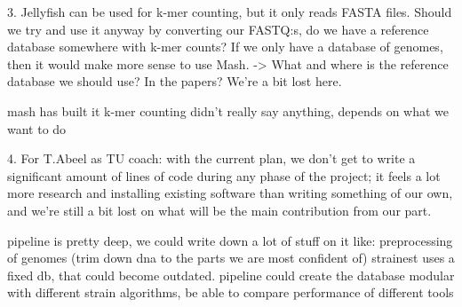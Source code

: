 3. Jellyfish can be used for k-mer counting, but it only reads FASTA files. Should we try and use it anyway by converting our FASTQ:s, do we have a reference database somewhere with k-mer counts? If we only have a database of genomes, then it would make more sense to use Mash. -> What and where is the reference database we should use? In the papers? We're a bit lost here.

mash has built it k-mer counting
didn't really say anything, depends on what we want to do


4. For T.Abeel as TU coach: with the current plan, we don't get to write a significant amount of lines of code during any phase of the project; it feels a lot more research and installing existing software than writing something of our own, and we're still a bit lost on what will be the main contribution from our part.


pipeline is pretty deep, we could write down a lot of stuff on it
like: preprocessing of genomes (trim down dna to the parts we are most confident of)
strainest uses a fixed db, that could become outdated. pipeline could create the database
modular with different strain algorithms, be able to compare performance of different tools